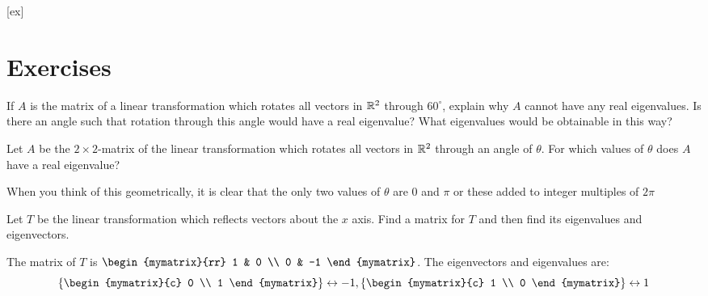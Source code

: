 [ex]
\section*{Exercises}

\begin{enumialphparenastyle}

\begin{ex} If $A$ is the matrix of a linear transformation which rotates all
vectors in $\mathbb{R}^{2}$ through $60^{\circ }$, explain why $A$ cannot
have any real eigenvalues. Is there an angle such that rotation through this
angle would have a real eigenvalue? What eigenvalues would be obtainable in
this way? \vspace{1mm} 
\end{ex}


\begin{ex} Let $A$ be the $2\times 2$-matrix of the linear transformation which
rotates all vectors in $\mathbb{R}^{2}$ through an angle of $\theta$. For
which values of $\theta $ does $A$ have a real eigenvalue? 
\begin{sol}
When you think of this geometrically, it is clear that the only two values
of $\theta $ are 0 and $\pi $ or these added to integer multiples of $2\pi $
\end{sol}
\end{ex}


\begin{ex} Let $T$ be the linear transformation which reflects vectors about
the $x$ axis. Find a matrix for $T$ and then find its eigenvalues and
eigenvectors. 
\begin{sol}
The matrix of $T$ is $\begin{mymatrix}{rr}
1 & 0 \\
0 & -1
\end{mymatrix}$. The eigenvectors and eigenvalues are:
\[
\set{\begin{mymatrix}{c}
0 \\
1
\end{mymatrix} } \leftrightarrow -1,\set{\begin{mymatrix}{c}
1 \\
0
\end{mymatrix} } \leftrightarrow 1
\]
\end{sol}
\end{ex}


\end{enumialphparenastyle}
